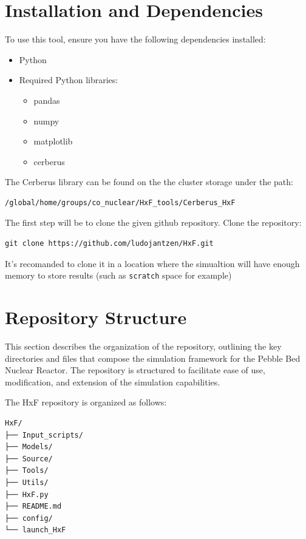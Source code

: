 \documentclass{article}
\begin{document}
\section{Installation and Dependencies}
To use this tool, ensure you have the following dependencies installed:
\begin{itemize}
    \item Python 
    \item Required Python libraries:
    \begin{itemize}
        \item pandas
        \item numpy
        \item matplotlib
        \item cerberus
    \end{itemize}
\end{itemize}

The Cerberus library can be found on the the cluster storage under the path: 
\begin{verbatim}
/global/home/groups/co_nuclear/HxF_tools/Cerberus_HxF
\end{verbatim}

The first step will be to clone the given github repository.
Clone the repository:
\begin{lstlisting}[style=pythonstyle]
git clone https://github.com/ludojantzen/HxF.git
\end{lstlisting}

It's recomanded to clone it in a location where the simualtion will have enough memory to store results (such as \texttt{scratch} space for example)

\newpage
\section{Repository Structure}

This section describes the organization of the repository, outlining the key directories and files that compose the simulation framework for the Pebble Bed Nuclear Reactor. The repository is structured to facilitate ease of use, modification, and extension of the simulation capabilities.

The HxF repository is organized as follows:

\begin{verbatim}
HxF/
├── Input_scripts/
├── Models/
├── Source/
├── Tools/
├── Utils/
├── HxF.py
├── README.md
├── config/
└── launch_HxF

\end{verbatim}
\end{document}
